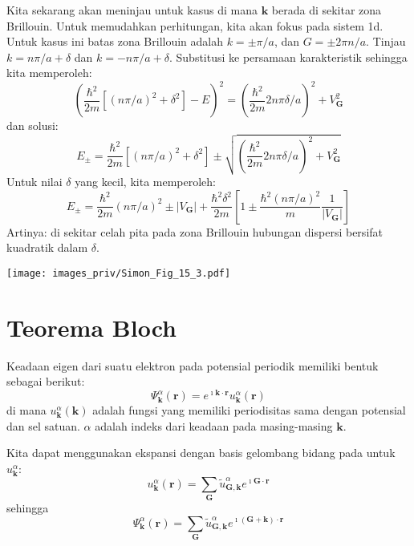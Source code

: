 Kita sekarang akan meninjau untuk kasus di mana $\mathbf{k}$
berada di sekitar zona Brillouin.
Untuk memudahkan perhitungan, kita akan fokus pada sistem 1d.
Untuk kasus ini batas zona Brillouin adalah
$k = \pm \pi/a$, dan
$G = \pm 2\pi n /a$.
Tinjau $k = n\pi/a + \delta$ dan $k = -n\pi/a + \delta$.
Substitusi ke persamaan karakteristik sehingga kita memperoleh:
\begin{equation}
\left( \frac{\hbar^2}{2m}\left[ (n\pi/a)^2 + \delta^2 \right] - E \right)^2 =
\left( \frac{\hbar^2}{2m} 2n\pi\delta/a \right)^2 + V_{\mathbf{G}}^2
\end{equation}
dan solusi:
\begin{equation}
E_{\pm} = \frac{\hbar^2}{2m} \left[ (n\pi/a)^2 + \delta^2 \right] \pm
\sqrt{\left( \frac{\hbar^2}{2m} 2n\pi\delta/a \right)^2 + V_{\mathbf{G}}^2}
\end{equation}
Untuk nilai $\delta$ yang kecil, kita memperoleh:
\begin{equation}
E_{\pm} = \frac{\hbar^2}{2m} (n\pi/a)^2 \pm |V_{\mathbf{G}}| +
\frac{\hbar^2 \delta^2}{2m} \left[
1 \pm \frac{\hbar^2 (n\pi/a)^2}{m} \frac{1}{|V_{\mathbf{G}}|}
\right]
\end{equation}
Artinya: di sekitar celah pita pada zona Brillouin hubungan dispersi bersifat kuadratik
dalam $\delta$.

{\centering
\texttt{[image: images\_priv/Simon\_Fig\_15\_3.pdf]}
\par}

\section{Teorema Bloch}

Keadaan eigen dari suatu elektron pada potensial periodik memiliki
bentuk sebagai berikut:
\begin{equation}
\Psi^{\alpha}_{\mathbf{k}}(\mathbf{r}) = e^{\imath \mathbf{k} \cdot \mathbf{r} }
u^{\alpha}_{\mathbf{k}}(\mathbf{r})
\end{equation}
di mana $u^{\alpha}_{\mathbf{k}}(\mathbf{k})$ adalah fungsi yang memiliki periodisitas
sama dengan potensial dan sel satuan.
$\alpha$ adalah indeks dari keadaan pada masing-masing $\mathbf{k}$.

Kita dapat menggunakan ekspansi dengan basis gelombang bidang pada untuk
$u^{\alpha}_{\mathbf{k}}$:
\begin{equation}
u^{\alpha}_{\mathbf{k}}(\mathbf{r}) = \sum_{\mathbf{G}}
\tilde{u}^{\alpha}_{\mathbf{G},\mathbf{k}} e^{\imath \mathbf{G} \cdot \mathbf{r}}
\end{equation}
sehingga
\begin{equation}
\Psi^{\alpha}_{\mathbf{k}}(\mathbf{r}) = \sum_{\mathbf{G}}
\tilde{u}^{\alpha}_{\mathbf{G},\mathbf{k}} e^{\imath (\mathbf{G} + \mathbf{k}) \cdot \mathbf{r}}
\end{equation}